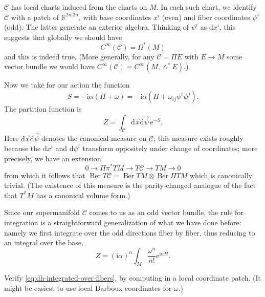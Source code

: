 \documentclass[12pt,letterpaper,reqno]{article}
\numberwithin{equation}{section}
\newcommand{\cC}{\ensuremath{\mathcal C}}
\newcommand{\R}{\ensuremath{\mathbb R}}
\newcommand{\I}{{\mathrm i}}
\newcommand{\e}{{\mathrm e}}
\newcommand{\de}{\mathrm{d}}
\DeclareMathOperator{\Ber}{Ber}
\begin{document}
$\cC$ has local charts induced from the charts on $M$.
In each such chart, we identify $\cC$ with a patch of 
$\R^{2n \vert 2n}$, with base coordinates $x^i$ (even)
and fiber coordinates $\psi^i$ (odd). The latter generate an
exterior algebra. Thinking of $\psi^i$ as $\de x^i$, this
suggests that globally we should have
\begin{equation}
  C^\infty(\cC) = \Omega^*(M)
\end{equation}
and this is indeed true.
(More generally, for any $\cC = \Pi E$ with $E \to M$ some vector
bundle we would have $C^\infty(\cC) = C^\infty(M, \wedge^* E)$.)

Now we take for our action the function
\begin{equation}
  S = -\I \alpha (H + \omega) = -\I \alpha (H + \omega_{ij} \psi^i \psi^j).
\end{equation}
The partition function is
\begin{equation}
  Z = \int_\cC \de \vec{x} \de \vec{\psi} \, \e^{-S}.
\end{equation}
Here $\de \vec{x} \de \vec{\psi}$ denotes the canonical measure
on $\cC$; this measure exists roughly because the
$\de x^i$ and $\de \psi^i$ transform oppositely under
change of coordinates; more precisely, we have an extension
\begin{equation}
  0 \to \Pi \pi^* TM \to T\cC \to TM \to 0
\end{equation}
from which it follows that $\Ber T\cC = \Ber TM \otimes \Ber \Pi TM$
which is canonically trivial. (The existence of this measure is
the parity-changed analogue of the fact that $T^* M$ has a canonical
volume form.)

Since our supermanifold $\cC$ comes to us as an odd vector bundle, the
rule for integration is a straightforward generalization of what we
have done before: namely we first integrate over the odd directions fiber
by fiber, thus reducing to an integral over the base,
\begin{equation} \label{eq:dh-integrated-over-fibers}
  Z = (\I \alpha)^n \int_M \frac{\omega^n}{n!} \e^{\I \alpha H}.
\end{equation}

\begin{exercise} Verify \eqref{eq:dh-integrated-over-fibers}, by 
computing in a local coordinate patch. (It might be easiest to use 
local Darboux coordinates for $\omega$.)
\end{exercise}
\end{document}
